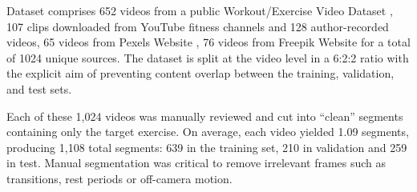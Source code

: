 \documentclass[journal,onecolumn, 11pt]{IEEEtran}
\begin{document}
Dataset comprises 652 videos from a public Workout/Exercise Video Dataset \cite{abdillah2023}
, 107 clips downloaded from YouTube fitness channels and 128 author-recorded videos, 65 videos from Pexels Website \cite{Pexels}, 76 videos from Freepik Website \cite{Freepik} for a total of 1024 unique sources. The dataset is split at the video level in a 6:2:2 ratio with the explicit aim of preventing content overlap between the training, validation, and test sets.

Each of these 1,024 videos was manually reviewed and cut into “clean” segments containing only the target exercise. On average, each video yielded 1.09 segments, producing 1,108 total segments: 639 in the training set, 210 in validation and 259 in test. Manual segmentation was critical to remove irrelevant frames such as transitions, rest periods or off-camera motion.


\end{document}
